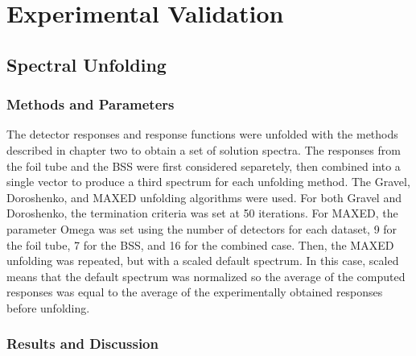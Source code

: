 
\cleardoublepage


\chapter{Experimental Validation}




\section{Spectral Unfolding}

\subsection{Methods and Parameters}

The detector responses and response functions were unfolded with the methods described in chapter two to obtain a set of solution spectra.
The responses from the foil tube and the BSS were first considered separetely, then combined into a single vector to produce a third spectrum for each unfolding method.
The Gravel, Doroshenko, and MAXED unfolding algorithms were used.
For both Gravel and Doroshenko, the termination criteria was set at 50 iterations.
For MAXED, the parameter Omega was set using the number of detectors for each dataset, 9 for the foil tube, 7 for the BSS, and 16 for the combined case.
Then, the MAXED unfolding was repeated, but with a scaled default spectrum.
In this case, scaled means that the default spectrum was normalized so the average of the computed responses was equal to the average of the experimentally obtained responses before unfolding.

\subsection{Results and Discussion}


